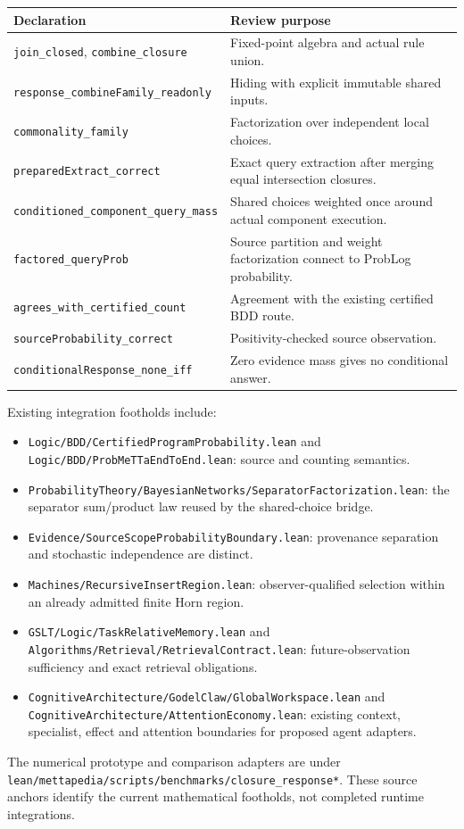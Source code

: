 \documentclass[11pt,a4paper]{article}
\newcommand{\code}[1]{\nolinkurl{#1}}
\begin{document}
\begingroup\small
\begin{tabularx}{\textwidth}{@{}P{.50\textwidth}Y@{}}
\toprule
Declaration & Review purpose \\
\midrule
\code{join_closed}, \code{combine_closure} & Fixed-point algebra and actual rule union. \\
\code{response_combineFamily_readonly} & Hiding with explicit immutable shared inputs. \\
\code{commonality_family} & Factorization over independent local choices. \\
\code{preparedExtract_correct} & Exact query extraction after merging equal intersection closures. \\
\code{conditioned_component_query_mass} & Shared choices weighted once around actual component execution. \\
\code{factored_queryProb} & Source partition and weight factorization connect to ProbLog probability. \\
\code{agrees_with_certified_count} & Agreement with the existing certified BDD route. \\
\code{sourceProbability_correct} & Positivity-checked source observation. \\
\code{conditionalResponse_none_iff} & Zero evidence mass gives no conditional answer. \\
\bottomrule
\end{tabularx}
\endgroup

Existing integration footholds include:
\begin{itemize}
\item \code{Logic/BDD/CertifiedProgramProbability.lean} and
  \code{Logic/BDD/ProbMeTTaEndToEnd.lean}: source and counting semantics.
\item \code{ProbabilityTheory/BayesianNetworks/SeparatorFactorization.lean}:
  the separator sum/product law reused by the shared-choice bridge.
\item \code{Evidence/SourceScopeProbabilityBoundary.lean}:
  provenance separation and stochastic independence are distinct.
\item \code{Machines/RecursiveInsertRegion.lean}: observer-qualified selection
  within an already admitted finite Horn region.
\item \code{GSLT/Logic/TaskRelativeMemory.lean} and
  \code{Algorithms/Retrieval/RetrievalContract.lean}: future-observation
  sufficiency and exact retrieval obligations.
\item \code{CognitiveArchitecture/GodelClaw/GlobalWorkspace.lean} and
  \code{CognitiveArchitecture/AttentionEconomy.lean}: existing context,
  specialist, effect and attention boundaries for proposed agent adapters.
\end{itemize}
The numerical prototype and comparison adapters are under
\code{lean/mettapedia/scripts/benchmarks/closure_response*}.
These source anchors identify the current mathematical footholds, not completed
runtime integrations.
\end{document}
